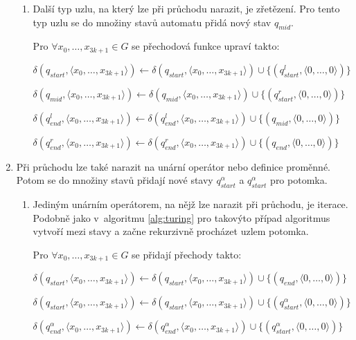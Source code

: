 \documentclass[thesis=B,czech]{FITthesis}[2019/12/23]
\theoremstyle{definition}
\begin{document}
\begin{enumerate}
\begin{enumerate}
	 \item \label{itm:concat2}{Další typ uzlu, na který lze při průchodu narazit, je zřetězení. Pro tento typ uzlu se do množiny stavů automatu přidá nový stav $q_{mid}$. 
	
	Pro $\forall x_0, \dots, x_{3k+1} \in G$ se přechodová funkce upraví takto:

		$\delta(q_{start}, \langle  x_0, \dots, x_{3k+1}\rangle)\leftarrow\delta(q_{start}, \langle  x_0, \dots, x_{3k+1}\rangle)\cup\{(q_{start}^{l}, \langle 0, \dots, 0\rangle)\}$

		$\delta(q_{mid}, \langle  x_0, \dots, x_{3k+1}\rangle)\leftarrow\delta(q_{mid}, \langle  x_0, \dots, x_{3k+1}\rangle)\cup\{(q_{start}^{r}, \langle 0, \dots, 0\rangle)\}$

		$\delta(q_{end}^{l}, \langle  x_0, \dots, x_{3k+1}\rangle)\leftarrow\delta(q_{end}^{l}, \langle  x_0, \dots, x_{3k+1}\rangle)\cup\{(q_{mid}, \langle 0, \dots,  0\rangle)\} $

		$\delta(q_{end}^{r}, \langle  x_0, \dots, x_{3k+1}\rangle)\leftarrow\delta(q_{end}^{r}, \langle  x_0, \dots, x_{3k+1}\rangle)\cup\{(q_{end}, \langle 0, \dots, 0\rangle)\} $
	}

   \end{enumerate}
    \item{Při průchodu lze také narazit na unární operátor nebo definice proměnné. Potom se do množiny stavů přidají nové stavy $q_{start}^{\alpha}$ a  $q_{start}^{\alpha}$ pro potomka.}
	\begin{enumerate}
	 \item \label{itm:iter2}{Jediným unárním operátorem, na nějž lze narazit při průchodu, je iterace. Podobně jako v~algoritmu \ref{alg:turing} pro takovýto případ algoritmus vytvoří  mezi stavy a začne rekurzivně procházet uzlem potomka.
	
	Pro $\forall x_0, \dots, x_{3k+1} \in G$ se přidají přechody takto:

		$\delta(q_{start}, \langle  x_0, \dots, x_{3k+1}\rangle)\leftarrow\delta(q_{start}, \langle  x_0, \dots, x_{3k+1}\rangle)\cup\{(q_{end}, \langle 0, \dots, 0\rangle)\}$

		$\delta(q_{start}, \langle  x_0, \dots, x_{3k+1}\rangle)\leftarrow\delta(q_{start}, \langle  x_0, \dots, x_{3k+1}\rangle)\cup\{(q_{start}^{\alpha}, \langle 0, \dots, 0\rangle)\}$

		$\delta(q_{end}^{\alpha}, \langle  x_0, \dots, x_{3k+1}\rangle)\leftarrow\delta(q_{end}^{\alpha}, \langle  x_0, \dots, x_{3k+1}\rangle)\cup\{(q_{start}^{\alpha}, \langle 0, \dots, 0\rangle)\} $

}
\end{enumerate}
\end{enumerate}
\end{document}
